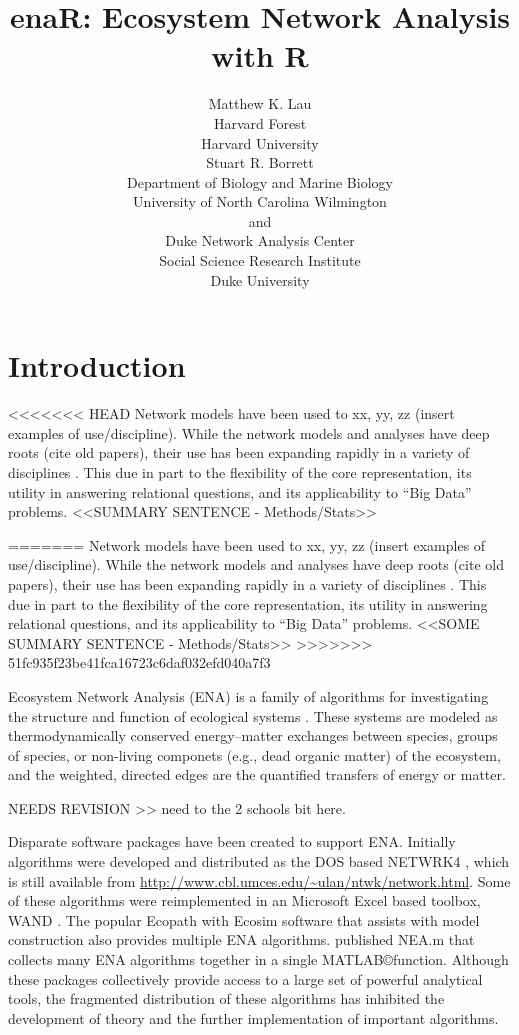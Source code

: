 \documentclass[article]{jss}
\author{Matthew K. Lau\\Harvard Forest\\Harvard University\\ \And
        Stuart R. Borrett\\Department of Biology and Marine Biology\\
        University of North Carolina Wilmington\\and\\Duke Network
        Analysis Center\\Social Science Research Institute\\Duke University}
\title{enaR: Ecosystem Network Analysis with R}
\begin{document}

\section[Introduction]{Introduction}
<<<<<<< HEAD
Network models have been used to xx, yy, zz (insert examples of
use/discipline).  While the network models and analyses have deep
roots (cite old papers), their use has been expanding rapidly in a
variety of disciplines \cite{social science, borrett14_rise, ings09,
  others??}.  This due in part to the flexibility of the core
representation, its utility in answering relational questions, and its
applicability to ``Big Data'' problems.  <<SUMMARY SENTENCE - Methods/Stats>>

=======
Network models have been used to xx, yy, zz (insert examples of use/discipline).  While
the network models and analyses have deep roots (cite old papers),
their use has been expanding rapidly in a variety of disciplines
\cite{social science, borrett14_rise, ings09, others??}.  This due in
part to the flexibility of the core representation, its utility in
answering relational questions, and its applicability to ``Big Data''
problems.  <<SOME SUMMARY SENTENCE - Methods/Stats>>
>>>>>>> 51fc935f23be41fca16723c6daf032efd040a7f3


Ecosystem Network Analysis (ENA) is a family of algorithms for
investigating the structure and function of ecological systems
\cite{borrett12_netecol,ulanowicz86,fath99_review}.  These systems are
modeled as thermodynamically conserved energy--matter exchanges
between species, groups of species, or non-living componets (e.g.,
dead organic matter) of the ecosystem, and the weighted, directed
edges are the quantified transfers of energy or matter.

NEEDS REVISION >> need to the 2 schools bit here.

Disparate software packages have been created to support
ENA. Initially algorithms were developed and distributed as the DOS
based NETWRK4 \cite{ulanowicz91}, which is still available from
\url{http://www.cbl.umces.edu/~ulan/ntwk/network.html}.  Some of these
algorithms were reimplemented in an Microsoft Excel based toolbox,
WAND \cite{allesina04_wand}. The popular Ecopath with Ecosim software
that assists with model construction \citep{christensen04} also
provides multiple ENA algorithms.  \citet{fath06}
published NEA.m that collects many ENA algorithms together in a single
MATLAB\copyright function. Although these packages collectively
provide access to a large set of powerful analytical tools, the
fragmented distribution of these algorithms has inhibited the
development of theory and the further implementation of important
algorithms.
\end{document}
